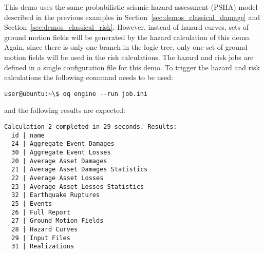 This demo uses the same probabilistic seismic hazard assessment (PSHA) model
described in the previous examples in Section~\ref{sec:demos_classical_damage}
and Section~\ref{sec:demos_classical_risk}. However, instead of hazard curves,
sets of ground motion fields will be generated by the hazard calculation of
this demo. Again, since there is only one branch in the logic tree, only one
set of ground motion fields will be used in the risk calculations. The hazard
and risk jobs are defined in a single configuration file for this demo. To
trigger the hazard and risk calculations the following command needs to be
used:

\begin{verbatim}
user@ubuntu:~\$ oq engine --run job.ini
\end{verbatim}

and the following results are expected:

\begin{verbatim}
Calculation 2 completed in 29 seconds. Results:
  id | name
  24 | Aggregate Event Damages
  30 | Aggregate Event Losses
  20 | Average Asset Damages
  21 | Average Asset Damages Statistics
  22 | Average Asset Losses
  23 | Average Asset Losses Statistics
  32 | Earthquake Ruptures
  25 | Events
  26 | Full Report
  27 | Ground Motion Fields
  28 | Hazard Curves
  29 | Input Files
  31 | Realizations
\end{verbatim}
